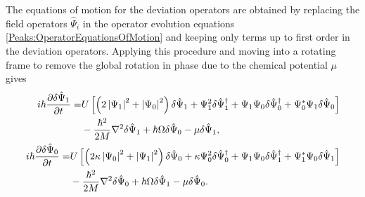 The equations of motion for the deviation operators are obtained by replacing the field operators $\hat{\Psi}_i$ in the operator evolution equations \eqref{Peaks:OperatorEquationsOfMotion} and keeping only terms up to first order in the deviation operators. Applying this procedure and moving into a rotating frame to remove the global rotation in phase due to the chemical potential $\mu$ gives
\begin{subequations}
    \label{Peaks:DeviationOperatorsEvolutionXSpace}
    \begin{align}
        \begin{split}
            i \hbar \frac{\partial \delta \hat{\Psi}_1}{\partial t} =& U\left[ \left(2\abs{\Psi_1}^2+\abs{\Psi_0}^2 \right)\delta \hat{\Psi}_1 + \Psi_1^2\delta\hat{\Psi}_1^\dagger + \Psi_1\Psi_0\delta\hat{\Psi}_0^\dagger + \Psi_0^*\Psi_1\delta\hat{\Psi}_0\right]\\
                    & - \frac{\hbar^2}{2M}\nabla^2 \delta \hat{\Psi}_1 +\hbar \Omega\delta\hat{\Psi}_0- \mu \delta \hat{\Psi}_1,
        \end{split}\\
        \begin{split}
        i \hbar \frac{\partial \delta \hat{\Psi}_0}{\partial t} =& U\left[\left(2\kappa \abs{\Psi_0}^2 +\abs{\Psi_1}^2\right)\delta\hat{\Psi}_0 + \kappa \Psi_0^2 \delta\hat{\Psi}_0^\dagger + \Psi_1\Psi_0\delta\hat{\Psi}_1^\dagger + \Psi_1^*\Psi_0\delta\hat{\Psi}_1\right]\\
                    & -\frac{\hbar^2}{2M}\nabla^2 \delta \hat{\Psi}_0 +\hbar \Omega\delta\hat{\Psi}_1 - \mu \delta\hat{\Psi}_0.
        \end{split}
    \end{align}
\end{subequations}

